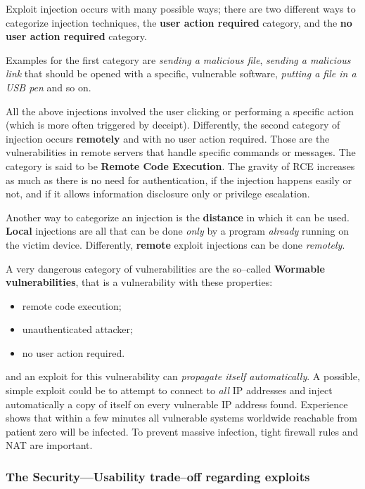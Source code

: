 \documentclass[10pt]{\classname}
\begin{document}
Exploit injection occurs with many possible ways; there are two different ways
to categorize injection techniques, the \textbf{user action required} category,
and the \textbf{no user action required} category.

Examples for the first category are \emph{sending
a malicious file}, \emph{sending a malicious link} that should be opened
with a specific, vulnerable software, \emph{putting a file in a USB pen} and
so on.

All the above injections involved the user clicking or performing a specific
action (which is more often triggered by deceipt). Differently, the second category
of injection occurs \textbf{remotely} and with no user action required. Those are
the vulnerabilities in remote servers that handle specific commands or
messages. The category is said to be \textbf{Remote Code Execution}. The
gravity of RCE increases as much as there is no need for authentication, if the
injection happens easily or not, and if it allows information disclosure only
or privilege escalation.

Another way to categorize an injection is the \textbf{distance} in which it can
be used. \textbf{Local} injections are all that can be done \emph{only} by a
program \emph{already} running on the victim device. Differently,
\textbf{remote} exploit injections can be done \emph{remotely}.

A very dangerous category of vulnerabilities are the so--called
\textbf{Wormable vulnerabilities}, that is a vulnerability with these
properties:
\begin{itemize}
    \item remote code execution;
    \item unauthenticated attacker;
    \item no user action required.
\end{itemize}
and an exploit for this vulnerability can \emph{propagate itself
automatically}. A possible, simple exploit could be to attempt to connect to
\emph{all} IP addresses and inject automatically a copy of itself on every
vulnerable IP address found. Experience shows that within a few minutes all
vulnerable systems worldwide reachable from patient zero will be infected. To
prevent massive infection, tight firewall rules and NAT are important.

\subsubsection{The Security---Usability trade--off regarding exploits}
\end{document}
